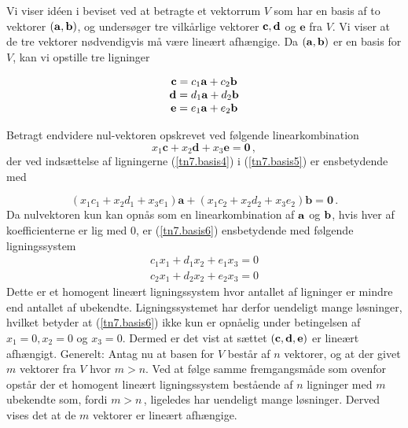 \begin{bevis}
Vi viser idéen i beviset ved at betragte et vektorrum $V$ som har en basis af to vektorer $(\mathbf{a},\mathbf{b})$, og undersøger tre vilkårlige vektorer $\mathbf{c},\mathbf d$ og $\mathbf e$ fra $V$. Vi viser at de tre vektorer nødvendigvis må være lineært afhængige. 
\bs
Da $(\mathbf{a},\mathbf{b})$ er en basis for $V$, kan vi opstille tre ligninger

\begin{equation}\label{tn7.basis4}
\begin{array}{c}
\mathbf c =c_1\mathbf{a}+c_2\mathbf{b}\\
\mathbf d =d_1\mathbf{a}+d_2\mathbf{b}\\
\mathbf e =e_1\mathbf{a}+e_2\mathbf{b}
\end{array}
\end{equation}

Betragt endvidere nul-vektoren opskrevet ved følgende linearkombination
\begin{equation}\label{tn7.basis5}
x_1\mathbf c+x_2\mathbf d +x_3\mathbf e = \mathbf 0\,,
\end{equation}
der ved indsættelse af ligningerne (\ref{tn7.basis4}) i (\ref{tn7.basis5}) er ensbetydende med

\begin{equation}\label{tn7.basis6}
(x_1c_1+x_2d_1+x_3e_1)\mathbf a +
(x_1c_2+x_2d_2+x_3e_2)\mathbf b =\mathbf 0\,.
\end{equation}
Da nulvektoren kun kan opnås som en linearkombination af $\mathbf{a}$ og $\mathbf{b}$, hvis hver af koefficienterne er lig med $0$, er (\ref{tn7.basis6}) ensbetydende med følgende ligningssystem
\begin{equation}\label{tn7.basis7}
\begin{array}{c}
c_1x_1+d_1x_2+e_1x_3=0\\
c_2x_1+d_2x_2+e_2x_3=0
\end{array}
\end{equation}
Dette er et homogent lineært ligningssystem hvor antallet af ligninger er mindre end antallet af ubekendte. Ligningssystemet har derfor uendeligt mange løsninger, hvilket betyder at (\ref{tn7.basis6}) ikke kun er opnåelig under betingelsen af $x_1=0,x_2=0$ og $x_3=0$. Dermed er det vist at sættet $(\mathbf{c},\mathbf d,\mathbf e)$ er lineært afhængigt. \bs
Generelt: Antag nu at basen for $V$ består af $n$ vektorer, og at der givet $m$ vektorer fra $V$ hvor $m>n$. Ved at følge samme fremgangsmåde som ovenfor opstår der et homogent lineært ligningssystem bestående af $n$ ligninger med $m$ ubekendte som, fordi $m>n\,$, ligeledes har uendeligt mange løsninger. Derved vises det at de $m$ vektorer er lineært afhængige.
\end{bevis}

